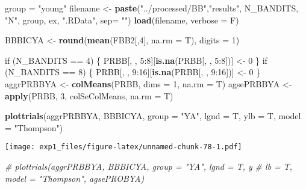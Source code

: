 \documentclass[11pt,,]{article}
\newenvironment{Shaded}{\begin{snugshade}}{\end{snugshade}}
\newcommand{\KeywordTok}[1]{\textcolor[rgb]{0.13,0.29,0.53}{\textbf{{#1}}}}
\newcommand{\DataTypeTok}[1]{\textcolor[rgb]{0.13,0.29,0.53}{{#1}}}
\newcommand{\DecValTok}[1]{\textcolor[rgb]{0.00,0.00,0.81}{{#1}}}
\newcommand{\StringTok}[1]{\textcolor[rgb]{0.31,0.60,0.02}{{#1}}}
\newcommand{\CommentTok}[1]{\textcolor[rgb]{0.56,0.35,0.01}{\textit{{#1}}}}
\newcommand{\NormalTok}[1]{{#1}}
\begin{document}
\begin{Shaded}
\begin{Highlighting}[]
\NormalTok{group =}\StringTok{ "young"}
\NormalTok{filename  <-}\StringTok{ }\KeywordTok{paste}\NormalTok{(}\StringTok{"../processed/BB"}\NormalTok{,}\StringTok{"results"}\NormalTok{, N_BANDITS, }\StringTok{"N"}\NormalTok{, }
                   \NormalTok{group, ex, }\StringTok{".RData"}\NormalTok{, }\DataTypeTok{sep=} \StringTok{""}\NormalTok{)}
\KeywordTok{load}\NormalTok{(filename, }\DataTypeTok{verbose =} \NormalTok{F)}

\NormalTok{BBBICYA <-}\StringTok{ }\KeywordTok{round}\NormalTok{(}\KeywordTok{mean}\NormalTok{(FBB2[,}\DecValTok{4}\NormalTok{], }\DataTypeTok{na.rm =} \NormalTok{T), }\DataTypeTok{digits =} \DecValTok{1}\NormalTok{)}

\NormalTok{if (N_BANDITS ==}\StringTok{ }\DecValTok{4}\NormalTok{) \{}
    \NormalTok{PRBB[, , }\DecValTok{5}\NormalTok{:}\DecValTok{8}\NormalTok{][}\KeywordTok{is.na}\NormalTok{(PRBB[, , }\DecValTok{5}\NormalTok{:}\DecValTok{8}\NormalTok{])] <-}\StringTok{ }\DecValTok{0}
\NormalTok{\}}
\NormalTok{if (N_BANDITS ==}\StringTok{ }\DecValTok{8}\NormalTok{) \{}
    \NormalTok{PRBB[, , }\DecValTok{9}\NormalTok{:}\DecValTok{16}\NormalTok{][}\KeywordTok{is.na}\NormalTok{(PRBB[, , }\DecValTok{9}\NormalTok{:}\DecValTok{16}\NormalTok{])] <-}\StringTok{ }\DecValTok{0}
\NormalTok{\}}
\NormalTok{aggrPRBBYA <-}\StringTok{ }\KeywordTok{colMeans}\NormalTok{(PRBB, }\DataTypeTok{dims =} \DecValTok{1}\NormalTok{, }\DataTypeTok{na.rm =} \NormalTok{T) }
\NormalTok{agsePRBBYA <-}\StringTok{ }\KeywordTok{apply}\NormalTok{(PRBB, }\DecValTok{3}\NormalTok{, colSeColMeans, }\DataTypeTok{na.rm =} \NormalTok{T) }
\end{Highlighting}
\end{Shaded}

\begin{Shaded}
\begin{Highlighting}[]
\KeywordTok{plottrials}\NormalTok{(aggrPRBBYA, BBBICYA, }\DataTypeTok{group =} \StringTok{"YA"}\NormalTok{, }\DataTypeTok{lgnd =} \NormalTok{T, }\DataTypeTok{ylb =} \NormalTok{T, }\DataTypeTok{model =} \StringTok{"Thompson"}\NormalTok{)}
\end{Highlighting}
\end{Shaded}

\texttt{[image: exp1\_files/figure-latex/unnamed-chunk-78-1.pdf]}

\begin{Shaded}
\begin{Highlighting}[]
\CommentTok{# plottrials(aggrPRBBYA, BBBICYA, group = "YA", lgnd = T, y}
           \CommentTok{# lb = T, model = "Thompson", agsePROBYA)}
\end{Highlighting}
\end{Shaded}
\end{document}

